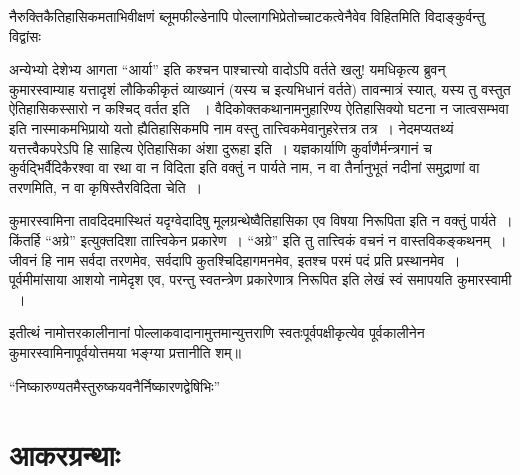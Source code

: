 नैरुक्तिकैतिहासिकमताभिवीक्षणं ब्लूमफील्डेनापि पोल्लागभिप्रेतोच्चाटकत्वेनैवेव विहितमिति विदाङ्कुर्वन्तु विद्वांसः 


अन्येभ्यो देशेभ्य आगता “आर्या” इति कश्चन पाश्चात्त्यो वादोऽपि वर्तते खलु! यमधिकृत्य ब्रुवन् कुमारस्वाम्याह यत्तादृशं लौकिकीकृतं व्याख्यानं (यस्य च  इत्यभिधानं वर्तते) तावन्मात्रं स्यात्, यस्य तु वस्तुत ऐतिहासिकस्सारो न कश्चिद् वर्तत इति ~। वैदिकोक्तकथानामनुहारिण्य ऐतिहासिक्यो घटना न जात्वसम्भवा इति नास्माकमभिप्रायो यतो ह्यैतिहासिकमपि नाम वस्तु तात्त्विकमेवानुहरेत्तत्र तत्र~। नेदमप्यतथ्यं यत्तत्त्वैकपरेऽपि हि साहित्य ऐतिहासिका अंशा दुरूहा इति~। यज्ञकार्याणि कुर्वाणैर्मन्त्रगानं च कुर्वद्भिर्वैदिकैरश्वा वा रथा वा न विदिता इति वक्तुं न पार्यते नाम, न वा तैर्नानुभूतं नदीनां समुद्राणां वा तरणमिति, न वा कृषिस्तैरविदिता चेति~।

कुमारस्वामिना तावदिदमास्थितं यदृग्वेदादिषु मूलग्रन्थेष्वैतिहासिका एव विषया निरूपिता इति न वक्तुं पार्यते~। किंतर्हि “अग्रे” इत्युक्तदिशा तात्त्विकेन प्रकारेण~। “अग्रे” इति तु तात्त्विकं वचनं न वास्तविकङ्कथनम्~। जीवनं हि नाम सर्वदा तरणमेव, सर्वदापि कुतश्चिदिहागमनमेव, इतश्च परमं पदं प्रति प्रस्थानमेव~। पूर्वमीमांसाया आशयो नामेदृश एव, परन्तु स्वतन्त्रेण प्रकारेणात्र निरूपित इति लेखं स्वं समापयति कुमारस्वामी ~।

इतीत्थं नामोत्तरकालीनानां पोल्लाकवादानामुत्तमान्युत्तराणि स्वतःपूर्वपक्षीकृत्येव पूर्वकालीनेन कुमारस्वामिनापूर्वयोत्तमया भङ्ग्या प्रत्तानीति शम्॥

\begin{center}
“निष्कारुण्यतमैस्तुरुष्कयवनैर्निष्कारणद्वेषिभिः”
\end{center}


\section*{आकरग्रन्थाः}

\retainauthsanskrit

